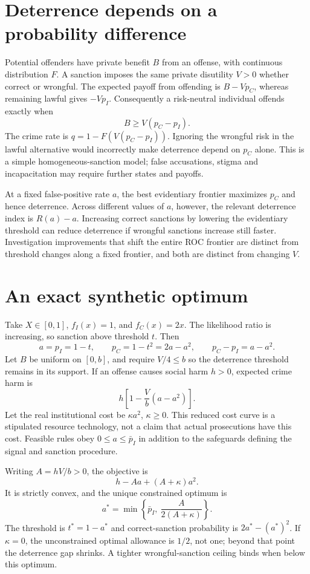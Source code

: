 \documentclass[11pt]{article}
\begin{document}
\section*{Deterrence depends on a probability difference}
Potential offenders have private benefit $B$ from an offense, with continuous distribution $F$. A sanction imposes the same private disutility $V>0$ whether correct or wrongful. The expected payoff from offending is $B-Vp_C$, whereas remaining lawful gives $-Vp_I$. Consequently a risk-neutral individual offends exactly when
\[
                         B\geq V(p_C-p_I).
\]
The crime rate is $q=1-F(V(p_C-p_I))$. Ignoring the wrongful risk in the lawful alternative would incorrectly make deterrence depend on $p_C$ alone. This is a simple homogeneous-sanction model; false accusations, stigma and incapacitation may require further states and payoffs.

At a fixed false-positive rate $a$, the best evidentiary frontier maximizes $p_C$ and hence deterrence. Across different values of $a$, however, the relevant deterrence index is $R(a)-a$. Increasing correct sanctions by lowering the evidentiary threshold can reduce deterrence if wrongful sanctions increase still faster. Investigation improvements that shift the entire ROC frontier are distinct from threshold changes along a fixed frontier, and both are distinct from changing $V$.

\section*{An exact synthetic optimum}
Take $X\in[0,1]$, $f_I(x)=1$, and $f_C(x)=2x$. The likelihood ratio is increasing, so sanction above threshold $t$. Then
\[
 a=p_I=1-t,\qquad p_C=1-t^2=2a-a^2,\qquad
 p_C-p_I=a-a^2.
\]
Let $B$ be uniform on $[0,b]$, and require $V/4\leq b$ so the deterrence threshold remains in its support. If an offense causes social harm $h>0$, expected crime harm is
\[
                         h\left[1-\frac{V}{b}(a-a^2)\right].
\]
Let the real institutional cost be $\kappa a^2$, $\kappa\geq0$. This reduced cost curve is a stipulated resource technology, not a claim that actual prosecutions have this cost. Feasible rules obey $0\leq a\leq\bar p_I$ in addition to the safeguards defining the signal and sanction procedure.

Writing $A=hV/b>0$, the objective is
\[
                       h-Aa+(A+\kappa)a^2.
\]
It is strictly convex, and the unique constrained optimum is
\[
                  a^*=\min\left\{\bar p_I,\ \frac{A}{2(A+\kappa)}\right\}.
\]
The threshold is $t^*=1-a^*$ and correct-sanction probability is $2a^*-(a^*)^2$. If $\kappa=0$, the unconstrained optimal allowance is $1/2$, not one; beyond that point the deterrence gap shrinks. A tighter wrongful-sanction ceiling binds when below this optimum.
\end{document}
